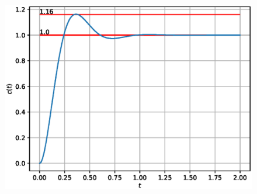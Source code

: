 \begin{enumerate}[label=\thesubsection.\arabic*.,ref=\thesubsection.\theenumi]
\begin{figure}[!h]
    \centering
    \includegraphics[width=\columnwidth]{figs/ee18btech11045.eps}
    \caption{}
    \label{fig:ee18btech11045_fig1}
\end{figure}

\end{enumerate}
